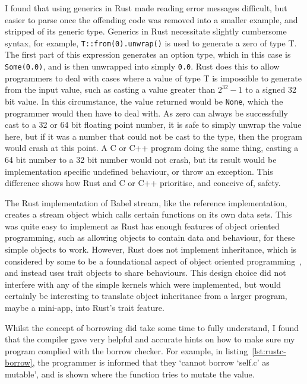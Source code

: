 I found that using generics in Rust made reading error messages difficult, but easier to parse once the offending code was removed into a smaller example, and stripped of its generic type. Generics in Rust necessitate slightly cumbersome syntax, for example, \texttt{T::from(0).unwrap()} is used to generate a zero of type T. 
The first part of this expression generates an option type, which in this case is \texttt{Some(0.0)}, and is then unwrapped into simply \texttt{0.0}. Rust does this to allow programmers to deal with cases where a value of type T is impossible to generate from the input value, such as casting a value greater than $2^{32} - 1$ to a signed 32 bit value.
In this circumstance, the value returned would be \texttt{None}, which the programmer would then have to deal with. As zero can always be successfully cast to a 32 or 64 bit floating point number, it is safe to simply unwrap the value here, but if it was a number that could not be cast to the type, then the program would crash at this point. A C or C++ program doing the same thing, casting a 64 bit number to a 32 bit number would not crash, but its result would be implementation specific undefined behaviour, or throw an exception. This difference shows how Rust and C or C++ prioritise, and conceive of, safety.

The Rust implementation of Babel stream, like the reference implementation, creates a stream object which calls certain functions on its own data sets. This was quite easy to implement as Rust has enough features of object oriented programming, such as allowing objects to contain data and behaviour, for these simple objects to work.
However, Rust does not implement inheritance, which is considered by some to be a foundational aspect of object oriented programming~\cite{Liskov:1987}, and instead uses trait objects to share behaviours. This design choice did not interfere with any of the simple kernels which were implemented, but would certainly be interesting to translate object inheritance from a larger program, maybe a mini-app, into Rust's trait feature.

Whilst the concept of borrowing did take some time to fully understand, I found that the compiler gave very helpful and accurate hints on how to make sure my program complied with the borrow checker. For example, in listing~\ref{lst:rustc-borrow}, the programmer is informed that they `cannot borrow `self.c' as mutable', and is shown where the function tries to mutate the value. 

